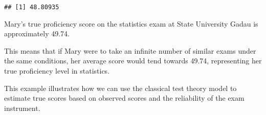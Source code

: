 \documentclass[
]{article}
\begin{document}
\begin{verbatim}
## [1] 48.80935
\end{verbatim}

Mary’s true proficiency score on the statistics exam at State University
Gadau is approximately 49.74.

This means that if Mary were to take an infinite number of similar exams
under the same conditions, her average score would tend towards 49.74,
representing her true proficiency level in statistics.

This example illustrates how we can use the classical test theory model
to estimate true scores based on observed scores and the reliability of
the exam instrument.
\end{document}
